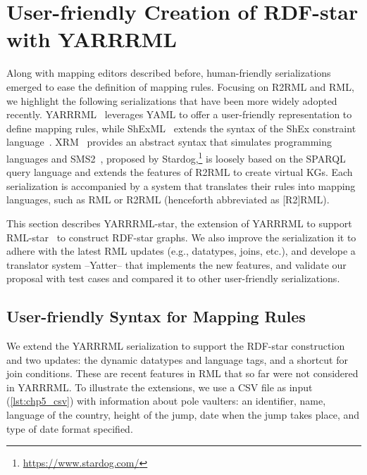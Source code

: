 \section{User-friendly Creation of RDF-star with YARRRML}
\label{sec:chp5_yarrrml_star}

Along with mapping editors described before, human-friendly serializations emerged 
to ease the definition of mapping rules. Focusing on R2RML and RML, we highlight the following serializations that have been more widely adopted recently.
YARRRML~\parencite{Heyvaert2018yarrrml} leverages YAML
to offer a user-friendly representation to define mapping rules, while
ShExML~\parencite{Garcia-Gonzalez2020shexml} extends the syntax of the ShEx constraint language~\parencite{prud2014shex}.
XRM~\parencite{xrm}
provides an abstract syntax that simulates programming languages and 
SMS2~\parencite{sms2}, proposed by Stardog,\footnote{\label{foot:stardog}\url{https://www.stardog.com/}} is loosely based on the SPARQL query language and extends the features of R2RML to create virtual KGs.
Each serialization is accompanied by a system that translates their rules into mapping languages, such as RML or R2RML (henceforth abbreviated as [R2]RML). 

This section describes YARRRML-star, the extension of YARRRML to support RML-star~\parencite{delva2021rml-star} to construct RDF-star graphs.
We also improve the serialization it to adhere with the latest RML updates
(e.g., datatypes, joins, etc.), and develope a translator system --Yatter-- that implements the new features, and validate our proposal with test cases and compared it to other user-friendly serializations.

\subsection{User-friendly Syntax for Mapping Rules}
\label{sec:chp5_yarrrml-desc}
We extend the YARRRML serialization to support the RDF-star construction and two updates: the dynamic datatypes and language tags, and a shortcut for join conditions. These are recent features in RML that so far were not considered in YARRRML.
To illustrate the extensions,
we use a CSV file as input (\cref{lst:chp5_csv}) with information about pole vaulters: an identifier, name, language of the country, height of the jump, date when the jump takes place, and type of date format specified.

